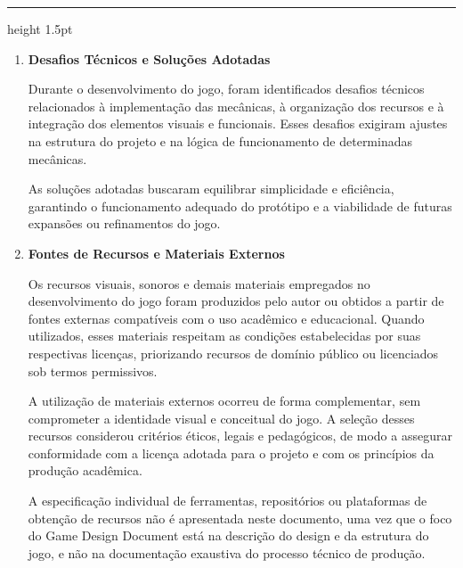 \documentclass[
oneside,
12pt,                  %
a4paper,               %
brazil,                %
sumario=abnt-6027-2012 %
]{abntex2}
\newenvironment{bloco}{%
	\medskip
	\setlength{\parskip}{1em}
	\setlength{\parindent}{1.25cm}
	\hrule height 1.5pt
	\medskip
}{}
\begin{document}
\begin{bloco}
\begin{enumerate}[font=\bfseries]
			A implementação foi realizada de forma incremental, permitindo testes constantes e ajustes progressivos ao longo do desenvolvimento.
			
			\item \textbf{Desafios Técnicos e Soluções Adotadas} 
			
			Durante o desenvolvimento do jogo, foram identificados desafios técnicos relacionados à implementação das mecânicas, à organização dos recursos e à integração dos elementos visuais e funcionais. Esses desafios exigiram ajustes na estrutura do projeto e na lógica de funcionamento de determinadas mecânicas.
			
			As soluções adotadas buscaram equilibrar simplicidade e eficiência, garantindo o funcionamento adequado do protótipo e a viabilidade de futuras expansões ou refinamentos do jogo.
			
			\item \textbf{Fontes de Recursos e Materiais Externos}
			
			Os recursos visuais, sonoros e demais materiais empregados no desenvolvimento do jogo foram produzidos pelo autor ou obtidos a partir de fontes externas compatíveis com o uso acadêmico e educacional. Quando utilizados, esses materiais respeitam as condições estabelecidas por suas respectivas licenças, priorizando recursos de domínio público ou licenciados sob termos permissivos.
			
			A utilização de materiais externos ocorreu de forma complementar, sem comprometer a identidade visual e conceitual do jogo. A seleção desses recursos considerou critérios éticos, legais e pedagógicos, de modo a assegurar conformidade com a licença adotada para o projeto e com os princípios da produção acadêmica.
			
			A especificação individual de ferramentas, repositórios ou plataformas de obtenção de recursos não é apresentada neste documento, uma vez que o foco do Game Design Document está na descrição do design e da estrutura do jogo, e não na documentação exaustiva do processo técnico de produção.
			
		\end{enumerate}
	\end{bloco}
	
\end{document}

